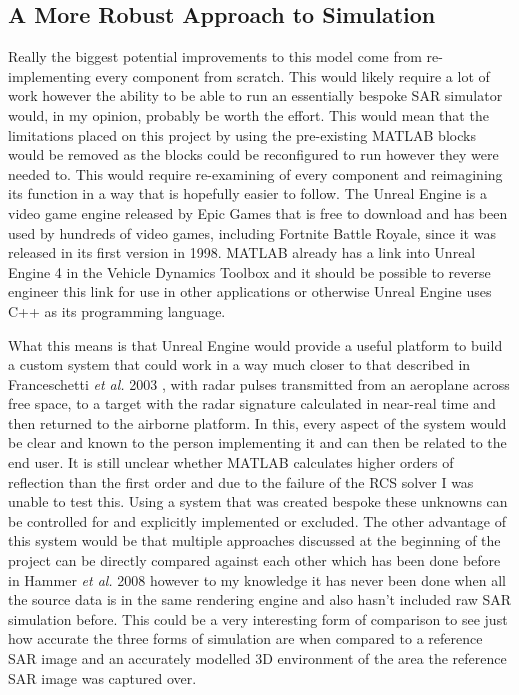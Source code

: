  \subsection{A More Robust Approach to Simulation}
 Really the biggest potential improvements to this model come from re-implementing every component from scratch. This would likely require a lot of work however the ability to be able to run an essentially bespoke SAR simulator would, in my opinion, probably be worth the effort. This would mean that the limitations placed on this project by using the pre-existing MATLAB blocks would be removed as the blocks could be reconfigured to run however they were needed to. This would require re-examining of every component and reimagining its function in a way that is hopefully easier to follow. The Unreal Engine is a video game engine released by Epic Games that is free to download and has been used by hundreds of video games, including Fortnite Battle Royale, since it was released in its first version in 1998. MATLAB already has a link into Unreal Engine 4 in the Vehicle Dynamics Toolbox and it should be possible to reverse engineer this link for use in other applications or otherwise Unreal Engine uses C++ as its programming language. \par What this means is that Unreal Engine would provide a useful platform to build a custom system that could work in a way much closer to that described in Franceschetti \textit{et al.} 2003 \cite{franceschettiSARRawSignal2003}, with radar pulses transmitted from an aeroplane across free space, to a target with the radar signature calculated in near-real time and then returned to the airborne platform. In this, every aspect of the system would be clear and known to the person implementing it and can then be related to the end user. It is still unclear whether MATLAB calculates higher orders of reflection than the first order and due to the failure of the RCS solver I was unable to test this. Using a system that was created bespoke these unknowns can be controlled for and explicitly implemented or excluded. The other advantage of this system would be that multiple approaches discussed at the beginning of the project can be directly compared against each other which has been done before in Hammer \textit{et al.} 2008 \cite{hammerComparisonSARSimulation2008} however to my knowledge it has never been done when all the source data is in the same rendering engine and also hasn't included raw SAR simulation before. This could be a very interesting form of comparison to see just how accurate the three forms of simulation are when compared to a reference SAR image and an accurately modelled 3D environment of the area the reference SAR image was captured over. \par 
